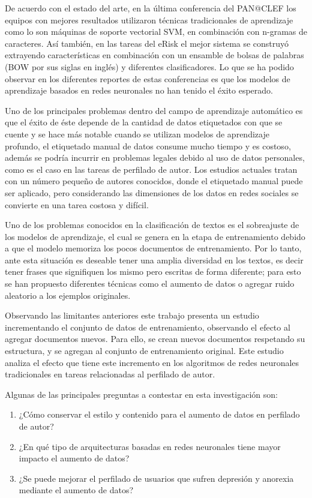 De acuerdo con el estado del arte, en la última conferencia del PAN@CLEF los equipos con mejores resultados utilizaron técnicas tradicionales de aprendizaje como lo son máquinas de soporte vectorial SVM, en combinación con n-gramas de caracteres. Así también, en las tareas del eRisk el mejor sistema se construyó extrayendo características en combinación con un ensamble de bolsas de palabras (BOW por sus siglas en inglés) y diferentes clasificadores. Lo que se ha podido observar en los diferentes reportes de estas conferencias es que los modelos de aprendizaje basados en redes neuronales no han tenido el éxito esperado. 

Uno de los principales problemas dentro del campo de aprendizaje automático es que el éxito de éste depende de la cantidad de datos etiquetados con que se cuente y se hace más notable cuando se utilizan modelos de aprendizaje profundo, el etiquetado manual de datos consume mucho tiempo y es costoso, además se podría incurrir en problemas legales debido al uso de datos personales, como es el caso en las tareas de perfilado de autor. Los estudios actuales tratan con un número pequeño de autores conocidos, donde el etiquetado manual puede ser aplicado, pero considerando las dimensiones de los datos en redes sociales se convierte en una tarea costosa y difícil.

Uno de los problemas conocidos en la clasificación de textos es el sobreajuste de los modelos de aprendizaje, el cual se genera en la etapa de entrenamiento debido a que el modelo memoriza los pocos documentos de entrenamiento. Por lo tanto, ante esta situación es deseable tener una amplia diversidad en los textos, es decir tener frases que signifiquen los mismo pero escritas de forma diferente; para esto se han propuesto diferentes técnicas como el aumento de datos o agregar ruido aleatorio a los ejemplos originales.

Observando las limitantes anteriores este trabajo presenta un estudio incrementando el conjunto de datos de entrenamiento, observando el efecto al agregar documentos nuevos. Para ello, se crean nuevos documentos respetando su estructura, y se agregan al conjunto de entrenamiento original. Este estudio analiza el efecto que tiene este incremento en los algoritmos de redes neuronales tradicionales en tareas relacionadas al perfilado de autor. 

Algunas de las principales preguntas a contestar en esta investigación son:

\begin{enumerate}
    \item {¿Cómo conservar el estilo y contenido para el aumento de datos en perfilado de autor?}
    \item ¿En qué tipo de arquitecturas basadas en redes neuronales tiene mayor impacto el aumento de datos?
    \item ¿Se puede mejorar el perfilado de usuarios que sufren depresión y anorexia mediante el aumento de datos?
   
\end{enumerate}


